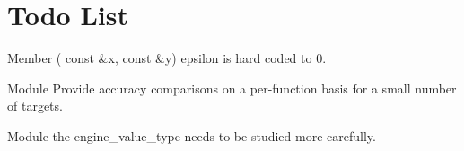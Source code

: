\chapter{Todo List}
\hypertarget{todo}{}\label{todo}

\begin{DoxyRefList}
\item[Member \doxylink{group__gtx__vector__angle_ga9556a803dce87fe0f42fdabe4ebba1d5}{glm\+::oriented\+Angle} (\doxylink{structglm_1_1vec_3_012_00_01_t_00_01_q_01_4}{vec$<$ 2, T, Q $>$} const \&x, \doxylink{structglm_1_1vec_3_012_00_01_t_00_01_q_01_4}{vec$<$ 2, T, Q $>$} const \&y)]\label{todo__todo000001}%
%
epsilon is hard coded to 0.  
\item[Module \doxylink{group__mathsf}{mathsf} ]\label{todo__todo000003}%
%
Provide accuracy comparisons on a per-\/function basis for a small number of targets. 
\item[Module \doxylink{group__tr1__random__generators}{tr1\+\_\+random\+\_\+generators} ]\label{todo__todo000004}%
%
the engine\+\_\+value\+\_\+type needs to be studied more carefully. 
\end{DoxyRefList}